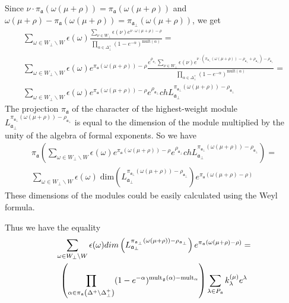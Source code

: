 \documentclass[a4paper,12pt]{article}
\theoremstyle{definition} \newtheorem{Def}{Definition}
\begin{document}
Since $\nu\cdot \pi_{\mathfrak{a}}(\omega(\mu+\rho))=\pi_{\mathfrak{a}}(\omega(\mu+\rho))$ and $\omega(\mu+\rho)-\pi_{\mathfrak{a}}(\omega(\mu+\rho))=\pi_{\mathfrak{a}_{\bot}}(\omega(\mu+\rho))$, we get
\begin{multline}
  \label{eq:14}
  \sum_{\omega\in W_{\bot}\backslash W} \epsilon(\omega) \frac{\sum_{\nu\in W_{\bot}}\epsilon(\nu) e^{\nu \cdot \omega(\mu+\rho)-\rho}}{\prod_{\alpha\in\Delta^{+}_{\bot}}(1-e^{-\alpha})^{\mathrm{mult}(\alpha)}} =\\
  \sum_{\omega\in W_{\bot}\backslash W} \epsilon(\omega) e^{\pi_{\mathfrak{a}}(\omega(\mu+\rho))-\rho} \frac{e^{\rho_{\mathfrak{a}_{\bot}} }\sum_{\nu\in W_{\bot}}\epsilon(\nu) e^{\nu \cdot (\pi_{\mathfrak{a}_{\bot}}(\omega(\mu+\rho))-\rho_{\mathfrak{a}_{\bot}}+\rho_{\mathfrak{a}_{\bot}})-\rho_{\mathfrak{a}_{\bot}}}}{\prod_{\alpha\in\Delta^{+}_{\bot}}(1-e^{-\alpha})^{\mathrm{mult}(\alpha)}}=\\
  \sum_{\omega\in W_{\bot}\backslash W} \epsilon(\omega) e^{\pi_{\mathfrak{a}}(\omega(\mu+\rho))-\rho}e^{\rho_{\mathfrak{a}_{\bot}}} ch L^{\pi_{\mathfrak{a}_{\bot}}(\omega(\mu+\rho))-\rho_{\mathfrak{a}_{\bot}}}_{\mathfrak{a}_{\bot}}
\end{multline}
The projection $\pi_{\mathfrak{a}}$ of the character of the highest-weight module $L^{\pi_{\mathfrak{a}_{\bot}}(\omega(\mu+\rho))-\rho_{\mathfrak{a}_{\bot}}}_{\mathfrak{a}_{\bot}}$ is equal to the dimension of the module multiplied by the unity of the algebra of formal exponents. So we have
  \begin{multline}
    \label{eq:15}
    \pi_{\mathfrak{a}}\left( \sum_{\omega\in W_{\bot}\backslash W} \epsilon(\omega) e^{\pi_{\mathfrak{a}}(\omega(\mu+\rho))-\rho}e^{\rho_{\mathfrak{a}_{\bot}}} ch L^{\pi_{\mathfrak{a}_{\bot}}(\omega(\mu+\rho))-\rho_{\mathfrak{a}_{\bot}}}_{\mathfrak{a}_{\bot}}\right) = \\
    \sum_{\omega\in W_{\bot}\backslash W} \epsilon(\omega)\; \mathrm{dim}\left(L^{\pi_{\mathfrak{a}_{\bot}}(\omega(\mu+\rho))-\rho_{\mathfrak{a}_{\bot}}}_{\mathfrak{a}_{\bot}}\right) e^{\pi_{\mathfrak{a}}(\omega(\mu+\rho)-\rho)}
  \end{multline}
These dimensions of the modules could be easily calculated using the Weyl formula.

Thus we have the equality
\begin{multline}
  \label{eq:9}
  \sum_{\omega\in W_{\bot}\backslash W} \epsilon(\omega) dim\left(L^{\pi_{\mathfrak{a}_{\bot}}(\omega(\mu+\rho))-\rho_{\mathfrak{a}_{\bot}}}_{\mathfrak{a}_{\bot}}\right) e^{\pi_{\mathfrak{a}}(\omega(\mu+\rho)-\rho)}=\\
  \left(\prod_{\alpha\in \pi_{\mathfrak{a}}\left(\Delta^{+}\setminus \Delta^{+}_{\bot}\right)}(1-e^{-\alpha})^{{\rm mult}_{\mathfrak{g}}(\alpha)-{\rm mult}_{\mathfrak{\alpha}}} \right)
  \sum_{\lambda \in P_{\frak{a}}}k_{\lambda}^{\left( \mu \right) }e^{\lambda }
\end{multline}
\end{document}

